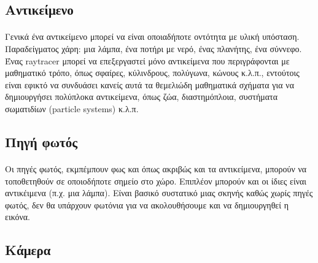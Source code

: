 \begin{sloppypar}
\subsection{Αντικείμενο}
\paragraph{}
	Γενικά ένα αντικείμενο μπορεί να είναι οποιαδήποτε οντότητα με υλική υπόσταση. Παραδείγματος χάρη: 
μια λάμπα, ένα ποτήρι με νερό, ένας πλανήτης, ένα σύννεφο. Ένας raytracer μπορεί να επεξεργαστεί μόνο 
αντικείμενα που περιγράφονται με μαθηματικό τρόπο, όπως σφαίρες, κύλινδρους, πολύγωνα, κώνους κ.λ.π., 
εντούτοις είναι εφικτό να συνδυάσει κανείς αυτά τα θεμελιώδη μαθηματικά σχήματα για να δημιουργήσει 
πολύπλοκα αντικείμενα, όπως ζώα, διαστημόπλοια, συστήματα σωματιδίων (particle systems) κ.λ.π.

\subsection{Πηγή φωτός}
\paragraph{}
	Οι πηγές φωτός, εκμπέμπουν φως και όπως ακριβώς και τα αντικείμενα, μπορούν να τοποθετηθούν σε
οποιοδήποτε σημείο στο χώρο. Επιπλέον μπορούν και οι ίδιες είναι αντικέιμενα (π.χ. μια λάμπα). Είναι βασικό 
συστατικό μιας σκηνής καθώς χωρίς πηγές φωτός, δεν θα υπάρχουν φωτόνια για να ακολουθήσουμε και 
να δημιουργηθεί η εικόνα.

\subsection{Κάμερα}

\end{sloppypar}

